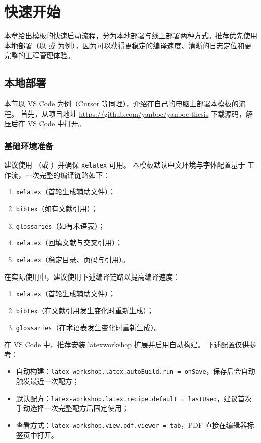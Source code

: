 \chapter{快速开始}
\label{chap1}

本章给出模板的快速启动流程，分为本地部署与线上部署两种方式。推荐优先使用本地部署（以  或  为例），因为可以获得更稳定的编译速度、清晰的日志定位和更完整的工程管理体验。

\section{本地部署}

本节以 VS Code 为例（Cursor 等同理），介绍在自己的电脑上部署本模板的流程。
首先，从项目地址 \url{https://github.com/yanboc/yanboc-thesis} 下载源码，解压后在 VS Code 中打开。

\subsection{基础环境准备}

建议使用 （或 ）并确保 \texttt{xelatex} 可用。
本模板默认中文环境与字体配置基于  工作流，一次完整的编译链路如下：
\begin{mynotice}
\begin{enumerate}
  \item \texttt{xelatex}（首轮生成辅助文件）；
  \item \texttt{bibtex}（如有文献引用）；
  \item \texttt{glossaries}（如有术语表）；
  \item \texttt{xelatex}（回填文献与交叉引用）；
  \item \texttt{xelatex}（稳定目录、页码与引用）。
\end{enumerate}
\end{mynotice}
在实际使用中，建议使用下述编译链路以提高编译速度：
\begin{mynotice}
  \begin{enumerate}
    \item \texttt{xelatex}（首轮生成辅助文件）；
    \item \texttt{bibtex}（在文献引用发生变化时重新生成）；
    \item \texttt{glossaries}（在术语表发生变化时重新生成）。
  \end{enumerate}
  \end{mynotice}
在 VS Code 中，推荐安装 \gls{latexworkshop} 扩展并启用自动构建。
下述配置仅供参考：
\begin{itemize}
  \item 自动构建：\texttt{latex-workshop.latex.autoBuild.run = onSave}，保存后会自动触发最近一次配方；
  \item 默认配方：\texttt{latex-workshop.latex.recipe.default = lastUsed}，建议首次手动选择一次完整配方后固定使用；
  \item 查看方式：\texttt{latex-workshop.view.pdf.viewer = tab}，PDF 直接在编辑器标签页中打开。
\end{itemize}

